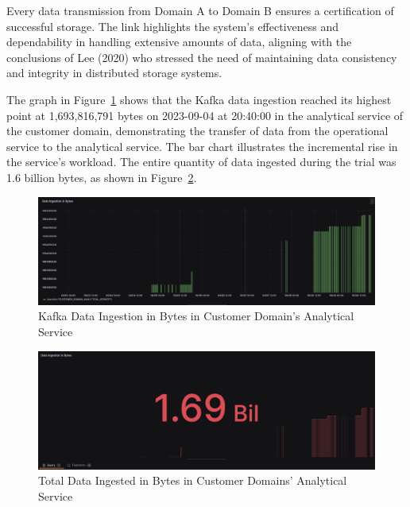 \documentclass[journal]{IEEEtran}
\begin{document}
Every data transmission from Domain A to Domain B ensures a certification of successful storage. The link highlights the system's effectiveness and dependability in handling extensive amounts of data, aligning with the conclusions of Lee (2020) who stressed the need of maintaining data consistency and integrity in distributed storage systems. 

The graph in Figure~\ref{kafkIngestionInBytesInCustomerDomainAnalyticalService} shows that the Kafka data ingestion reached its highest point at 1,693,816,791 bytes on 2023-09-04 at 20:40:00 in the analytical service of the customer domain, demonstrating the transfer of data from the operational service to the analytical service. The bar chart illustrates the incremental rise in the service's workload.  The entire quantity of data ingested during the trial was 1.6 billion bytes, as shown in Figure~\ref{totalDataIngestedinBytesInCustomerDomainsAnalyticalService}.


\begin{figure}[h]
  \centering
  \includegraphics[width=\linewidth]{images/Kafka-ingestion-in-Bytes.png}
  \caption{Kafka Data Ingestion in Bytes in Customer Domain's Analytical Service}
  \label{kafkIngestionInBytesInCustomerDomainAnalyticalService}
  \end{figure}

\begin{figure}[h]
  \centering
  \includegraphics[width=\columnwidth]{images/total-data-ingested-in-bytes.jpeg}
  \caption{Total Data Ingested in Bytes in Customer Domains' Analytical Service}
  \label{totalDataIngestedinBytesInCustomerDomainsAnalyticalService}
\end{figure}
\end{document}
